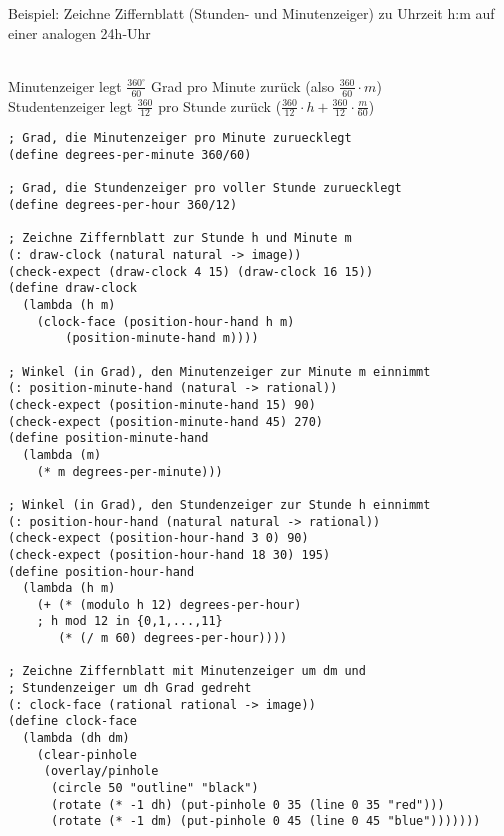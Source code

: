 Beispiel: Zeichne Ziffernblatt (Stunden- und Minutenzeiger) zu Uhrzeit h:m auf einer analogen 24h-Uhr\\
\\
  Minutenzeiger legt $\frac{360^{\circ}}{60}$ Grad pro Minute zur\"uck (also $\frac{360}{60} \cdot m$)\\
  Studentenzeiger legt $\frac{360}{12}$ pro Stunde zur\"uck
 ($\frac{360}{12} \cdot h +\frac{360}{12} \cdot \frac{m}{60}$)
\begin{lstlisting}[frame=single]
; Grad, die Minutenzeiger pro Minute zuruecklegt
(define degrees-per-minute 360/60)

; Grad, die Stundenzeiger pro voller Stunde zuruecklegt
(define degrees-per-hour 360/12)

; Zeichne Ziffernblatt zur Stunde h und Minute m
(: draw-clock (natural natural -> image))
(check-expect (draw-clock 4 15) (draw-clock 16 15))
(define draw-clock
  (lambda (h m)
    (clock-face (position-hour-hand h m)  
    	(position-minute-hand m))))

; Winkel (in Grad), den Minutenzeiger zur Minute m einnimmt
(: position-minute-hand (natural -> rational))
(check-expect (position-minute-hand 15) 90)
(check-expect (position-minute-hand 45) 270)
(define position-minute-hand
  (lambda (m)
    (* m degrees-per-minute)))

; Winkel (in Grad), den Stundenzeiger zur Stunde h einnimmt
(: position-hour-hand (natural natural -> rational))
(check-expect (position-hour-hand 3 0) 90)
(check-expect (position-hour-hand 18 30) 195)
(define position-hour-hand
  (lambda (h m)
    (+ (* (modulo h 12) degrees-per-hour)
    ; h mod 12 in {0,1,...,11}
       (* (/ m 60) degrees-per-hour))))

; Zeichne Ziffernblatt mit Minutenzeiger um dm und
; Stundenzeiger um dh Grad gedreht
(: clock-face (rational rational -> image))
(define clock-face
  (lambda (dh dm)
    (clear-pinhole
     (overlay/pinhole
      (circle 50 "outline" "black")
      (rotate (* -1 dh) (put-pinhole 0 35 (line 0 35 "red")))
      (rotate (* -1 dm) (put-pinhole 0 45 (line 0 45 "blue")))))))
\end{lstlisting}
